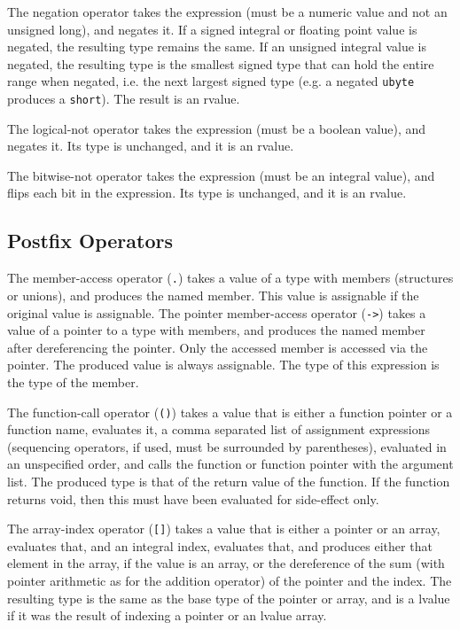 \documentclass[letterpaper,12pt]{book}
\begin{document}
The negation operator takes the expression (must be a numeric value and not an unsigned long), and negates it. If a signed integral or floating point value is negated, the resulting type remains the same. If an unsigned integral value is negated, the resulting type is the smallest signed type that can hold the entire range when negated, i.e. the next largest signed type (e.g. a negated \texttt{ubyte} produces a \texttt{short}). The result is an rvalue.

The logical-not operator takes the expression (must be a boolean value), and negates it. Its type is unchanged, and it is an rvalue.

The bitwise-not operator takes the expression (must be an integral value), and flips each bit in the expression. Its type is unchanged, and it is an rvalue.

\subsection{Postfix Operators}



The member-access operator (\texttt{.}) takes a value of a type with members (structures or unions), and produces the named member. This value is assignable if the original value is assignable. The pointer member-access operator (\texttt{->}) takes a value of a pointer to a type with members, and produces the named member after dereferencing the pointer. Only the accessed member is accessed via the pointer. The produced value is always assignable. The type of this expression is the type of the member.

The function-call operator (\texttt{()}) takes a value that is either a function pointer or a function name, evaluates it, a comma separated list of assignment expressions (sequencing operators, if used, must be surrounded by parentheses), evaluated in an unspecified order, and calls the function or function pointer with the argument list. The produced type is that of the return value of the function. If the function returns void, then this must have been evaluated for side-effect only.

The array-index operator (\texttt{[]}) takes a value that is either a pointer or an array, evaluates that, and an integral index, evaluates that, and produces either that element in the array, if the value is an array, or the dereference of the sum (with pointer arithmetic as for the addition operator) of the pointer and the index. The resulting type is the same as the base type of the pointer or array, and is a lvalue if it was the result of indexing a pointer or an lvalue array.
\end{document}
